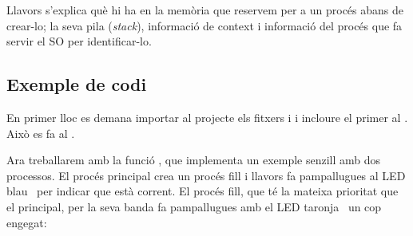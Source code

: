 Llavors s'explica què hi ha en la memòria que reservem per a un procés abans de crear-lo;
la seva pila (\emph{stack}), informació de context i informació del procés que fa servir el
SO per identificar-lo.

\subsection{Exemple de codi}

En primer lloc es demana importar al projecte els fitxers  i 
i incloure el primer al . Això es fa al .

Ara treballarem amb la funció , que implementa un exemple senzill amb dos processos.
El procés principal crea un procés fill i llavors fa pampallugues al LED blau~
per indicar que està corrent. El procés fill, que té la mateixa prioritat que el principal,
per la seva banda fa pampallugues amb el LED taronja~ un cop engegat:

